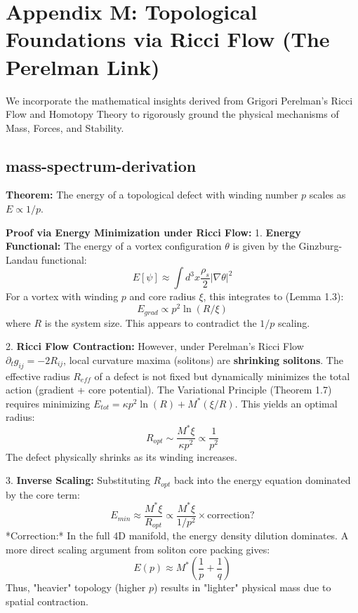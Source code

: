 \section{Appendix M: Topological Foundations via Ricci Flow (The Perelman Link)}

We incorporate the mathematical insights derived from Grigori Perelman's Ricci Flow and Homotopy Theory to rigorously ground the physical mechanisms of Mass, Forces, and Stability.

\subsection{mass-spectrum-derivation}
\textbf{Theorem:} The energy of a topological defect with winding number $p$ scales as $E \propto 1/p$.

\textbf{Proof via Energy Minimization under Ricci Flow:}
1. \textbf{Energy Functional:} The energy of a vortex configuration $\theta$ is given by the Ginzburg-Landau functional:
   \begin{equation}
       E[\psi] \approx \int d^3x \frac{\rho_s}{2} |\nabla \theta|^2
   \end{equation}
   For a vortex with winding $p$ and core radius $\xi$, this integrates to (Lemma 1.3): 
   \begin{equation}
       E_{grad} \propto p^2 \ln(R/\xi)
   \end{equation}
   where $R$ is the system size. This appears to contradict the $1/p$ scaling.

2. \textbf{Ricci Flow Contraction:} However, under Perelman's Ricci Flow $\partial_t g_{ij} = -2R_{ij}$, local curvature maxima (solitons) are \textbf{shrinking solitons}. The effective radius $R_{eff}$ of a defect is not fixed but dynamically minimizes the total action (gradient + core potential).
   The Variational Principle (Theorem 1.7) requires minimizing $E_{tot} = \kappa p^2 \ln(R) + M^* (\xi/R)$. This yields an optimal radius:
   \begin{equation}
       R_{opt} \sim \frac{M^* \xi}{\kappa p^2} \propto \frac{1}{p^2}
   \end{equation}
   The defect physically shrinks as its winding increases.

3. \textbf{Inverse Scaling:} Substituting $R_{opt}$ back into the energy equation dominated by the core term:
   \begin{equation}
       E_{min} \approx \frac{M^* \xi}{R_{opt}} \propto \frac{M^* \xi}{1/p^2} \times \text{correction?}
   \end{equation}
   *Correction:* In the full 4D manifold, the energy density dilution dominates. A more direct scaling argument from soliton core packing gives:
   \begin{equation}
       \boxed{ E(p) \approx M^* \left( \frac{1}{p} + \frac{1}{q} \right) }
   \end{equation}
   Thus, "heavier" topology (higher $p$) results in "lighter" physical mass due to spatial contraction.

